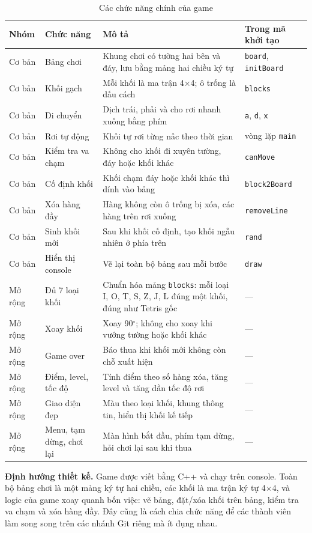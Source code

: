 \documentclass[13pt,a4paper]{extarticle}
\begin{document}
\begin{table}[H]
\centering\small
\begin{tabularx}{\linewidth}{@{}l l X l@{}}
\toprule
\textbf{Nhóm} & \textbf{Chức năng} & \textbf{Mô tả} & \textbf{Trong mã khởi tạo}\\
\midrule
Cơ bản & Bảng chơi & Khung chơi có tường hai bên và đáy, lưu bằng mảng hai chiều ký tự & \texttt{board}, \texttt{initBoard}\\
Cơ bản & Khối gạch & Mỗi khối là ma trận 4$\times$4; ô trống là dấu cách & \texttt{blocks}\\
Cơ bản & Di chuyển & Dịch trái, phải và cho rơi nhanh xuống bằng phím & \texttt{a}, \texttt{d}, \texttt{x}\\
Cơ bản & Rơi tự động & Khối tự rơi từng nấc theo thời gian & vòng lặp \texttt{main}\\
Cơ bản & Kiểm tra va chạm & Không cho khối đi xuyên tường, đáy hoặc khối khác & \texttt{canMove}\\
Cơ bản & Cố định khối & Khối chạm đáy hoặc khối khác thì dính vào bảng & \texttt{block2Board}\\
Cơ bản & Xóa hàng đầy & Hàng không còn ô trống bị xóa, các hàng trên rơi xuống & \texttt{removeLine}\\
Cơ bản & Sinh khối mới & Sau khi khối cố định, tạo khối ngẫu nhiên ở phía trên & \texttt{rand}\\
Cơ bản & Hiển thị console & Vẽ lại toàn bộ bảng sau mỗi bước & \texttt{draw}\\
\midrule
Mở rộng & Đủ 7 loại khối & Chuẩn hóa mảng \texttt{blocks}: mỗi loại I, O, T, S, Z, J, L đúng một khối, đúng như Tetris gốc & ---\\
Mở rộng & Xoay khối & Xoay 90$^\circ$; không cho xoay khi vướng tường hoặc khối khác & ---\\
Mở rộng & Game over & Báo thua khi khối mới không còn chỗ xuất hiện & ---\\
Mở rộng & Điểm, level, tốc độ & Tính điểm theo số hàng xóa, tăng level và tăng dần tốc độ rơi & ---\\
Mở rộng & Giao diện đẹp & Màu theo loại khối, khung thông tin, hiển thị khối kế tiếp & ---\\
Mở rộng & Menu, tạm dừng, chơi lại & Màn hình bắt đầu, phím tạm dừng, hỏi chơi lại sau khi thua & ---\\
\bottomrule
\end{tabularx}
\caption{Các chức năng chính của game}
\end{table}

\textbf{Định hướng thiết kế.} Game được viết bằng C++ và chạy trên console. Toàn bộ bảng chơi là một mảng ký tự hai chiều, các khối là ma trận ký tự 4$\times$4, và logic của game xoay quanh bốn việc: vẽ bảng, đặt/xóa khối trên bảng, kiểm tra va chạm và xóa hàng đầy. Đây cũng là cách chia chức năng để các thành viên làm song song trên các nhánh Git riêng mà ít đụng nhau.
\end{document}
